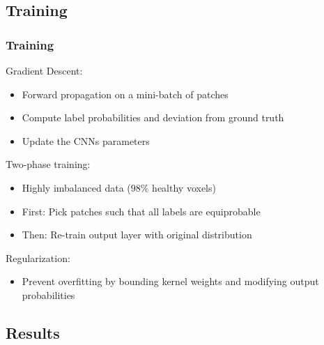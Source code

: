 \documentclass[aspectratio=43, notes]{beamer} 	%
\begin{document}
\subsection{Training}

\begin{frame}
	\frametitle<presentation>{Training}
	\begin{block}{Gradient Descent:}
		\begin{itemize}
			\item Forward propagation on a mini-batch of patches
			\item Compute label probabilities and deviation from ground truth
			\item Update the CNNs parameters
		\end{itemize}
	\end{block}
	\begin{block}{Two-phase training:}
		\begin{itemize}
			\item Highly imbalanced data ($98 \%$ healthy voxels)
			\item First: Pick patches such that all labels are equiprobable
			\item Then: Re-train output layer with original distribution
		\end{itemize} 	
 	\end{block}
 	\begin{block}{Regularization:}
		\begin{itemize}
			\item Prevent overfitting by bounding kernel weights and modifying output probabilities
		\end{itemize} 	
 	\end{block}
\end{frame}

\subsection{Results}
\end{document}
